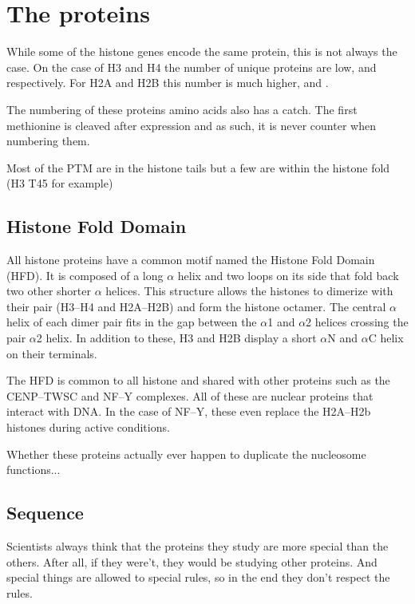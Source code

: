 \section{The proteins}
  While some of the histone genes encode the same protein, this is not always the
  case. On the case of H3 and H4 the number of unique proteins are low, \HThreeUniqueProteins{}
  and \HFourUniqueProteins{} respectively. For H2A and H2B this number is much higher, \HTwoAUniqueProteins{}
  and \HTwoBUniqueProteins{}.

  The numbering of these proteins amino acids also has a catch. The first methionine
  is cleaved after expression and as such, it is never counter when numbering them.

  Most of the PTM are in the histone tails but a few are within the histone fold (H3 T45 for example)

  \subsection{Histone Fold Domain}

    All histone proteins have a common motif named the Histone Fold Domain (HFD).
    It is composed of a long $\alpha$ helix and two loops on its side that fold
    back two other shorter $\alpha$ helices. This structure allows the histones
    to dimerize with their pair (H3--H4 and H2A--H2B) and form the histone
    octamer. The central $\alpha$ helix of each dimer pair fits in the gap between
    the $\alpha$1 and $\alpha$2 helices crossing the pair $\alpha$2 helix. In
    addition to these, H3 and H2B display a short $\alpha$N and $\alpha$C helix
    on their terminals.

    The HFD is common to all histone and shared with other
    proteins such as the CENP--TWSC and NF--Y complexes. All of these are nuclear
    proteins that interact with DNA. In the case of NF--Y, these even replace
    the H2A--H2b histones during active conditions.

    Whether these proteins actually ever happen to duplicate the nucleosome functions...

  \subsection{Sequence}
    Scientists always think that the proteins they study are more special than
    the others. After all, if they were't, they would be studying other proteins.
    And special things are allowed to special rules, so in the end they don't
    respect the rules.

